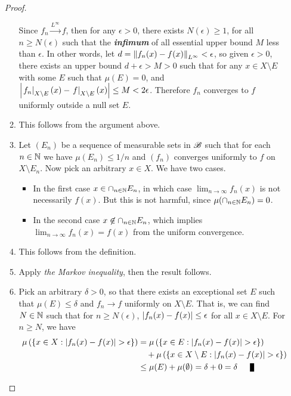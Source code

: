 \documentclass[11pt]{article}
\begin{document}
\begin{itemize}
\begin{proof}
\begin{enumerate}
Since $f_{n} \stackrel{L^{\infty}}{\rightarrow } f $, then for any $\epsilon>0$, there exists $N(\epsilon)\ge 1$, for all $n\ge N(\epsilon)$ such that the \emph{\textbf{infimum}} of all essential upper bound $M$ less than $\epsilon$. In other words, let $d= \left\|f_{n}(x)- f(x)\right\|_{L^{\infty}}<\epsilon $, so given $\epsilon>0$, there exists an upper bound $d+\epsilon>M>0$ such that for any $x\in X\setminus E$ with some $E$ such that $\mu(E)=0$, and $\left\lvert \left.{f_n}\right\vert_{X\setminus E}(x)- \left.{f}\right\vert_{X\setminus E}(x) \right\rvert\le M<2\epsilon$. Therefore $f_{n}$ converges to $f$ uniformly outside a null set $E$.

\item This follows from the argument above. 

\item Let $(E_n)$ be a sequence of measurable sets in ${\mathscr B}$ such that for each $n \in {\mathbb N}$ we have $\mu(E_n) \le 1/n$ and $(f_n)$ converges uniformly to $f$ on $X \setminus E_n$. Now pick an arbitrary $x \in X$. We have two cases. 
\begin{itemize}
\item In the first case $x\in \cap_{n \in {\mathbb N}}E_n$, in which case  $\lim_{n\rightarrow \infty}f_n(x)$ is not necessarily $f(x)$. But this is not harmful, since $\mu(\cap_{n \in {\mathbb N}}E_n) = 0$.
\item In the second case $x \not\in \cap_{n \in {\mathbb N}}E_n$, which implies $\lim_{n\rightarrow \infty}f_n(x) = f(x)$ from the uniform convergence. 
\end{itemize}

\item This follows from the definition. 

\item Apply \emph{the Markov inequality}, then the result follows.

\item Pick an arbitrary  $\delta >0$, so that there exists an exceptional set $E$ such that $\mu(E) \le \delta$ and $f_n \rightarrow f$ uniformly on $X \setminus E$. That is, we can find $N \in {\mathbb N}$ such that  for $n\ge N(\epsilon)$,  $\left\lvert f_{n}(x)- f(x) \right\rvert\le \epsilon$ for all $x\in X \setminus E$. For $n\ge N$, we have
\begin{align*}
\mu\paren{\set{x\in X: \abs{f_{n}(x)- f(x)}> \epsilon}} &= \mu\paren{\set{x\in E: \abs{f_{n}(x)- f(x)}> \epsilon}} \\
& \quad + \mu\paren{\set{x\in X \setminus E: \abs{f_{n}(x)- f(x)}> \epsilon}} \\
& \le \mu(E) + \mu(\emptyset) = \delta + 0 = \delta \qed 
\end{align*}
\end{enumerate}
\end{proof}


\end{itemize}
\end{document}
